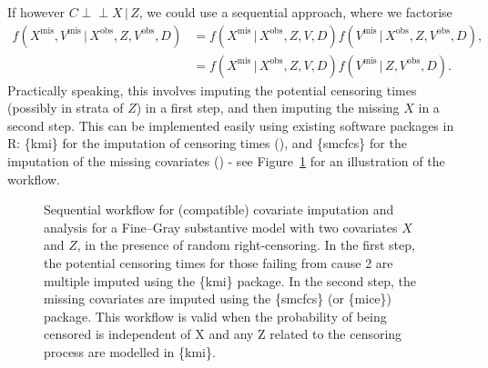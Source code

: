 \documentclass[
  letterpaper,
  DIV=11,
  numbers=noendperiod]{scrreprt}
\newcommand{\given}{\,|\,}
\newcommand{\indep}{\perp\!\!\!\!\perp}
\begin{document}
If however \(C \indep X \given Z\), we could use a sequential approach,
where we factorise \begin{align*}
    f(X^{\text{mis}}, V^{\text{mis}} \given X^{\text{obs}},Z,V^{\text{obs}},D) &= f(X^{\text{mis}} \given X^{\text{obs}},Z,V,D)f(V^{\text{mis}} \given X^{\text{obs}},Z,V^{\text{obs}},D), \\
    &= f(X^{\text{mis}} \given X^{\text{obs}},Z,V,D)f(V^{\text{mis}} \given Z,V^{\text{obs}},D).
\end{align*} Practically speaking, this involves imputing the potential
censoring times (possibly in strata of \(Z\)) in a first step, and then
imputing the missing \(X\) in a second step. This can be implemented
easily using existing software packages in R: \{kmi\} for the imputation
of censoring times
(), and \{smcfcs\} for the imputation of the missing
covariates () - see Figure~\ref{fig-workflow} for an
illustration of the workflow.

\begin{figure}


\caption{\label{fig-workflow}Sequential workflow for (compatible)
covariate imputation and analysis for a Fine--Gray substantive model
with two covariates \(X\) and \(Z\), in the presence of random
right-censoring. In the first step, the potential censoring times for
those failing from cause 2 are multiple imputed using the \{kmi\}
package. In the second step, the missing covariates are imputed using
the \{smcfcs\} (or \{mice\}) package. This workflow is valid when the
probability of being censored is independent of X and any Z related to
the censoring process are modelled in \{kmi\}.}

\end{figure}%
\end{document}

